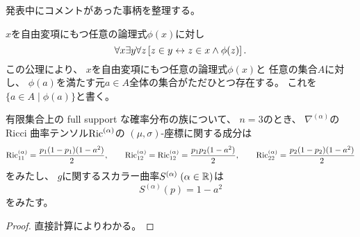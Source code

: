 \documentclass[report]{jlreq}
\begin{document}
%

発表中にコメントがあった事柄を整理する。

\begin{axiom}
    $x$を自由変項にもつ任意の論理式$\phi(x)$に対し
    \begin{equation}
        \forall x
        \exists y
        \forall z
        \left[{
            z \in y
            \leftrightarrow
            z \in x \land \phi(z)
        }\right].
    \end{equation}
    この公理により、
    $x$を自由変項にもつ任意の論理式$\phi(x)$と
    任意の集合$A$に対し、
    $\phi(a)$を満たす元$a \in A$全体の集合がただひとつ存在する。
    これを$\{ a \in A \mid \phi(a) \}$と書く。
\end{axiom}

\begin{axiom}
\end{axiom}

\begin{proposition}
    有限集合上の full support な確率分布の族について、
    $n = 3$のとき、
    $\nabla^{(\alpha)}$の
    Ricci 曲率テンソル$\operatorname{Ric}^{(\alpha)}$の
    $(\mu, \sigma)$-座標に関する成分は
    \begin{alignat}{1}
        \operatorname{Ric}^{(\alpha)}_{11}
            =
                \frac{p_1 (1 - p_1) (1 - a^2)}{2},
                \qquad
        \operatorname{Ric}^{(\alpha)}_{12} = \operatorname{Ric}^{(\alpha)}_{12}
            =
                \frac{p_1 p_2 (1 - a^2)}{2},
                \qquad
        \operatorname{Ric}^{(\alpha)}_{22}
            =
                \frac{p_2 (1 - p_2) (1 - a^2)}{2}
    \end{alignat}
    をみたし、
    $g$に関するスカラー曲率$S^{(\alpha)} \; (\alpha \in \mathbb{R})$は
    \begin{equation}
        S^{(\alpha)}(p)
            = 1 - a^2
    \end{equation}
    をみたす。
\end{proposition}

\begin{proof}
    直接計算によりわかる。
\end{proof}
\end{document}

